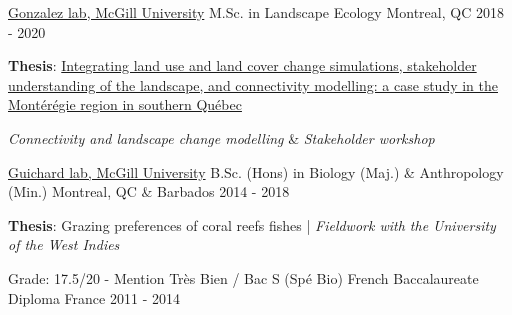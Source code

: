 

\begin{cventries}

  \cventry
    {\href{http://gonzalezlab.weebly.com/}{Gonzalez lab, McGill University}} %
    {M.Sc. in Landscape Ecology} %
    {Montreal, QC} %
    {2018 - 2020} %
    {
      \begin{cvitems} %
        \item {\textbf{Thesis}: \href{https://escholarship.mcgill.ca/concern/theses/mw22vb318?locale=en}{Integrating land use and land cover change simulations, stakeholder understanding of the landscape, and connectivity modelling: a case study in the Montérégie region in southern Québec}}
        \item {\textit{Connectivity and landscape change modelling}  \& \textit{Stakeholder workshop}}
      \end{cvitems}
    }


    \cventry
    {\href{https://guichardlab.weebly.com/cv.html}{Guichard lab, McGill University}} %
    {B.Sc. (Hons) in Biology (Maj.) \& Anthropology (Min.)} %
    {Montreal, QC \& Barbados} %
    {2014 - 2018} %
    {
      \begin{cvitems} %
        \item {\textbf{Thesis}: Grazing preferences of coral reefs fishes | \textit{Fieldwork with the University of the West Indies}}
      \end{cvitems}
    }

    \cventry
    {Grade: 17.5/20 - Mention Très Bien / Bac S (Spé Bio)} %
    {French Baccalaureate Diploma} %
    {France} %
    {2011 - 2014} %
    {}

\end{cventries}
